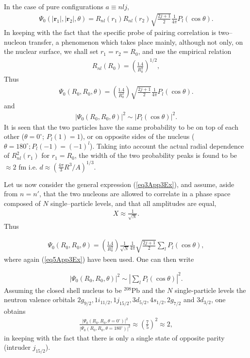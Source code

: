 \begin{subappendices}
In the case of pure configurations $a\equiv nlj$,
\begin{align}\label{eq4App3Ex}
\Psi_0(|\mathbf r_1|,|\mathbf r_2|,\theta)
=R_{nl}(r_1)R_{nl}(r_2)\sqrt{\frac{2j+1}{2}}\frac{1}{4\pi}P_l(\cos\theta).
\end{align}
In keeping with the fact that the specific probe of pairing correlation is two--nucleon transfer, a phenomenon which takes place mainly, although not only, on the nuclear surface, we shall set $r_1=r_2=R_0$, and use the empirical relation 
\begin{align}\label{eq5App3Ex}
R_{nl}(R_0)=\left(\frac{1.4}{R_0^3}\right)^{1/2},
\end{align}
Thus 
\begin{align}\label{eq6App3E}
\Psi_0(R_0,R_0,\theta)
=\left(\frac{1.4}{R_0^3}\right)\sqrt{\frac{2j+1}{2}}\frac{1}{4\pi}P_l(\cos\theta).
\end{align}
and 
\begin{align}\label{eq7App3E}
|\Psi_0(R_0,R_0,\theta)|^2\sim |P_l(\cos\theta)|^2.
\end{align}
It is seen that the two particles have the same probability to be on top of each other ($\theta=0^\circ$; $P_l(1)=1$), or on opposite sides of the nucleus ($\theta=180^\circ; P_l(-1)=(-1)^l$). Taking into account the actual radial dependence of $R^2_{nl}(r_1)$ for $r_1=R_0$, the width of the two probability peaks is found to be $\approx 2$ fm i.e. $d\approx\left(\frac{4\pi}{3}R^3/A\right)^{1/3}$.

Let us now consider the general expression (\ref{eq3App3Ex}), and assume, aside from $n=n'$, that  the two nucleons are allowed to correlate in a phase space composed of $N$ single--particle levels, and that all amplitudes are equal,
 \begin{align}\label{eq8App3E}
X\approx\frac{1}{\sqrt{N}}.
 \end{align}
Thus 

 \begin{align}\label{eq9App3E}
\Psi_0(R_0,R_0,\theta)
=\left(\frac{1.4}{R_0^3}\right)\frac{1}{\sqrt{N}}\frac{1}{4\pi}\sqrt{\frac{2j+1}{2}}\sum_lP_l(\cos\theta),
 \end{align}
where again (\ref{eq5App3Ex}) have been used. One can then  write 

\begin{align}\label{eq10App3E}
|\Psi_0(R_0,R_0,\theta)|^2\sim |\sum_lP_l(\cos\theta)|^2.
\end{align}
Assuming the closed shell nucleus to be $^{208}$Pb and  the $N$ single-particle levels  the neutron valence orbitals $2g_{9/2},1i_{11/2},1j_{15/2},3d_{5/2},4s_{1/2},2g_{7/2}$ and $3d_{3/2}$, one obtains
\begin{align}\label{eq11App3E}
\frac{|\Psi_0(R_0,R_0,\theta=0^\circ)|^2}{|\Psi_0(R_0,R_0,\theta=180^\circ)|^2}\approx\left(\frac{7}{5}\right)^2\approx2,
\end{align}
in keeping with the fact that there is only a single state of opposite parity (intruder $j_{15/2}$).


\end{subappendices}
